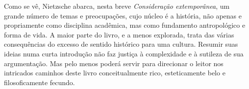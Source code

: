 Como se vê, Nietz\-sche abarca, nesta breve \emph{Consideração
extemporânea}, um grande número de temas e preocupações, cujo núcleo é a
história, não apenas e propriamente como disciplina acadêmica, mas como
fundamento antropológico e forma de vida. A maior parte do livro, e a
menos explorada, trata das várias consequências do excesso de sentido
histórico para uma cultura. Resumir suas ideias numa curta introdução
não faz justiça à complexidade e à sutileza de sua argumentação. Mas
pelo menos poderá servir para direcionar o leitor nos intricados
caminhos deste livro conceitualmente rico, esteticamente belo e
filosoficamente fecundo.
